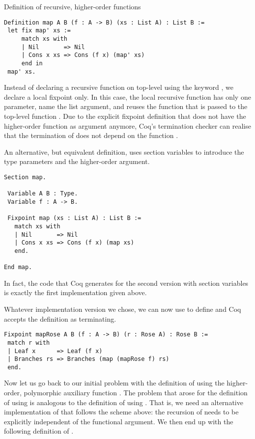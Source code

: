 \begin{excursus}{Definition of recursive, higher-order functions}
\begin{verbatim}
Definition map A B (f : A -> B) (xs : List A) : List B :=
 let fix map' xs :=
     match xs with
     | Nil       => Nil
     | Cons x xs => Cons (f x) (map' xs)
     end in
 map' xs.
\end{verbatim}

Instead of declaring a recursive function on top-level using the
keyword , we declare a local fixpoint only.
In this case, the local recursive function  has only one
parameter, name the list argument, and reuses the function 
that is passed to the top-level function .
Due to the explicit fixpoint definition that does not have the
higher-order function as argument anymore, Coq's termination checker
can realise that the termination of  does not depend on the
function .

An alternative, but equivalent definition, uses section variables to
introduce the type parameters and the higher-order argument.

\begin{verbatim}
Section map.

 Variable A B : Type.
 Variable f : A -> B.

 Fixpoint map (xs : List A) : List B :=
   match xs with
   | Nil       => Nil
   | Cons x xs => Cons (f x) (map xs)
   end.

End map.
\end{verbatim}

In fact, the code that Coq generates for the second version with
section variables is exactly the first implementation given above.

Whatever implementation version we chose, we can now use  to
define  and Coq accepts the definition as terminating.

\begin{verbatim}
Fixpoint mapRose A B (f : A -> B) (r : Rose A) : Rose B :=
 match r with
 | Leaf x      => Leaf (f x)
 | Branches rs => Branches (map (mapRose f) rs)
 end.
\end{verbatim}
\end{excursus}

Now let us go back to our initial problem with the definition of
 using the higher-order, polymorphic auxiliary function
.
The problem that arose for the definition of  using
 is analogous to the definition of 
using .
That is, we need an alternative implementation of 
that follows the scheme above: the recursion of  needs to
be explicitly independent of the functional argument.
We then end up with the following definition of .

